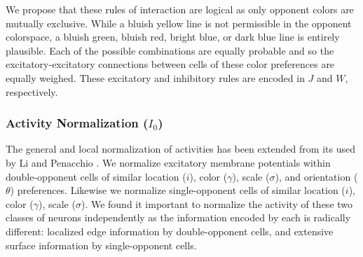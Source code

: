 \documentclass[journal,onecolumn]{IEEEtran}
\begin{document}
We propose that these rules of interaction are logical as only opponent colors are mutually exclusive. While a bluish yellow line is not permissible in the opponent colorspace, a bluish green, bluish red, bright blue, or dark blue line is entirely plausible. Each of the possible combinations are equally probable and so the excitatory-excitatory connections between cells of these color preferences are equally weighed. These excitatory and inhibitory rules are encoded in $J$ and $W$, respectively.

\subsubsection*{Activity Normalization ($I_0$)}
The general and local normalization of activities \cite{heeger:1992} has been extended from its used by Li \cite{li:1999} and Penacchio \cite{penacchio:2013}. We normalize excitatory membrane potentials within double-opponent cells of similar location ($i$), color ($\gamma$), scale ($\sigma$), and orientation ($\theta$) preferences. Likewise we normalize single-opponent cells of similar location ($i$), color ($\gamma$), scale ($\sigma$). We found it important to normalize the activity of these two classes of neurons independently as the information encoded by each is radically different: localized edge information by double-opponent cells, and extensive surface information by single-opponent cells.
\end{document}
